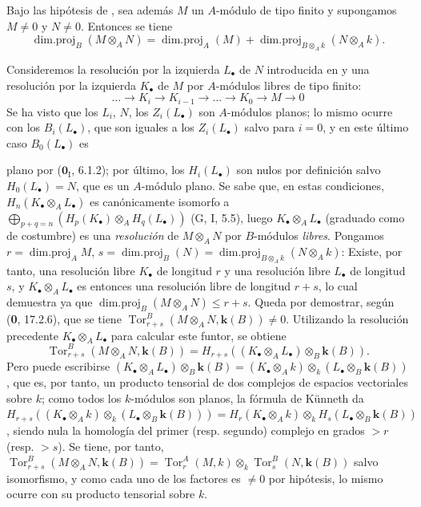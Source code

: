 \begin{proposition}[6.2.4]
\label{IV.6.2.4}
Bajo las hipótesis de \textup{}, sea
además $M$ un $A$-módulo de tipo finito y supongamos $M\neq0$ y
$N\neq0$. Entonces se tiene
\begin{equation}
 \operatorname{dim.proj}_B(M\otimes_AN)=
 \operatorname{dim.proj}_A(M)+
 \operatorname{dim.proj}_{B\otimes_Ak}(N\otimes_Ak).
 \label{IV.6.2.4.1}\tag{6.2.4.1}
\end{equation}
\end{proposition}

Consideremos la resolución por la izquierda $L_\bullet$ de $N$ introducida en
{} y una resolución por la izquierda
$K_\bullet$ de $M$ por $A$-módulos libres de tipo finito:
\[
 \ldots\longrightarrow K_i\longrightarrow K_{i-1}\longrightarrow
 \ldots\longrightarrow K_0\longrightarrow M\longrightarrow0
\]
Se ha visto que los $L_i$, $N$, los $Z_i(L_\bullet)$ son $A$-módulos
planos; lo mismo ocurre con los $B_i(L_\bullet)$, que son iguales a los
$Z_i(L_\bullet)$ salvo para $i=0$, y en este último caso
$B_0(L_\bullet)$ es

plano por ($\mathbf{0}_{\mathrm I}$, 6.1.2); por último, los $H_i(L_\bullet)$ son nulos
por definición salvo $H_0(L_\bullet)=N$, que es un $A$-módulo plano. Se
sabe que, en estas condiciones, $H_n(K_\bullet\otimes_AL_\bullet)$ es canónicamente isomorfo a
$\bigoplus_{p+q=n}(H_p(K_\bullet)\otimes_AH_q(L_\bullet))$
(G, I, 5.5), luego $K_\bullet\otimes_AL_\bullet$ (graduado como de
costumbre) es una \emph{resolución} de $M\otimes_AN$ por $B$-módulos
\emph{libres}. Pongamos
$r=\operatorname{dim.proj}_AM$,
$s=\operatorname{dim.proj}_B(N)=\operatorname{dim.proj}_{B\otimes_Ak}(N\otimes_Ak)$:
Existe, por tanto, una resolución libre $K_\bullet$ de longitud $r$ y una
resolución libre $L_\bullet$ de longitud $s$, y
$K_\bullet\otimes_AL_\bullet$ es entonces una resolución libre de longitud
$r+s$, lo cual demuestra ya que
$\operatorname{dim.proj}_B(M\otimes_AN)\leq r+s$. Queda por demostrar,
según (\textbf{0}, 17.2.6), que se tiene
$\operatorname{Tor}^{B}_{r+s}(M\otimes_AN,\boldsymbol{k}(B))\neq0$.
Utilizando la resolución precedente $K_\bullet\otimes_AL_\bullet$ para
calcular este funtor, se obtiene
\[
 \operatorname{Tor}^{B}_{r+s}(M\otimes_AN,\boldsymbol{k}(B))=
 H_{r+s}((K_\bullet\otimes_AL_\bullet)\otimes_B\boldsymbol{k}(B)).
\]
Pero puede escribirse
$(K_\bullet\otimes_AL_\bullet)\otimes_B\boldsymbol{k}(B)=(K_\bullet\otimes_Ak)\otimes_k(L_\bullet\otimes_B\boldsymbol{k}(B))$,
que es, por tanto, un producto tensorial de dos complejos de espacios
vectoriales sobre $k$; como todos los $k$-módulos son planos, la fórmula de
Künneth da
$H_{r+s}((K_\bullet\otimes_Ak)\otimes_k(L_\bullet\otimes_B\boldsymbol{k}(B)))=H_r(K_\bullet\otimes_Ak)\otimes_kH_s(L_\bullet\otimes_B\boldsymbol{k}(B))$,
siendo nula la homología del primer (resp. segundo) complejo en grados
$>r$ (resp. $>s$). Se tiene, por tanto,
$\operatorname{Tor}^{B}_{r+s}(M\otimes_AN,\boldsymbol{k}(B))=\operatorname{Tor}^{A}_{r}(M,k)\otimes_k\operatorname{Tor}^{B}_{s}(N,\boldsymbol{k}(B))$
salvo isomorfismo, y como cada uno de los factores es $\neq0$ por
hipótesis, lo mismo ocurre con su producto tensorial sobre $k$.

